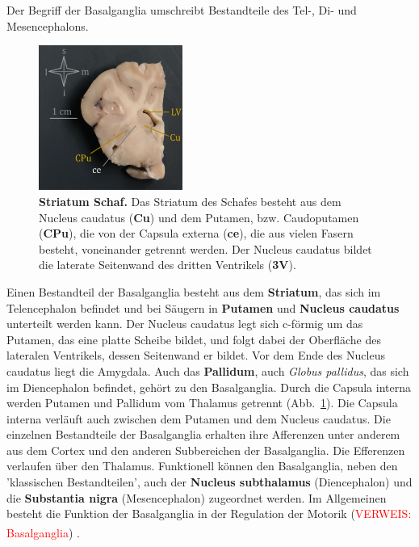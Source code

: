 \documentclass[12pt,a4paper,pdftex]{article}
\begin{document}
Der Begriff der Basalganglia umschreibt Bestandteile des Tel-, Di- und Mesencephalons.

\begin{figure}
    \centering
    \includegraphics[width=0.42\textwidth]{pictures/Bilder_Jule/Schaf/Ausschnitte/Striatum.png}
    \caption[Striatum Schaf.]{\textbf{Striatum Schaf.} Das Striatum des Schafes besteht aus dem Nucleus caudatus (\textbf{Cu}) und dem Putamen, bzw. Caudoputamen (\textbf{CPu}), die von der Capsula externa (\textbf{ce}), die aus vielen Fasern besteht, voneinander getrennt werden. Der Nucleus caudatus bildet die laterate Seitenwand des dritten Ventrikels (\textbf{3V}).}
    \label{fig:striatum}
\end{figure}

\noindent Einen Bestandteil der Basalganglia besteht aus dem \textbf{Striatum}, das sich im Telencephalon befindet und bei Säugern in \textbf{Putamen} und \textbf{Nucleus caudatus}  unterteilt werden kann. Der Nucleus caudatus legt sich c-förmig um das Putamen, das eine platte Scheibe bildet, und folgt dabei der Oberfläche des lateralen Ventrikels, dessen Seitenwand er bildet. Vor dem Ende des Nucleus caudatus liegt die Amygdala. Auch das \textbf{Pallidum}, auch \textit{Globus pallidus}, das sich im Diencephalon befindet, gehört zu den Basalganglia. Durch die Capsula interna werden Putamen und Pallidum vom Thalamus getrennt (Abb.~\ref{fig:striatum}). Die Capsula interna verläuft auch zwischen dem Putamen und dem Nucleus caudatus. Die einzelnen Bestandteile der Basalganglia erhalten ihre Afferenzen unter anderem aus dem Cortex und den anderen Subbereichen der Basalganglia. Die Efferenzen verlaufen über den Thalamus. Funktionell können den Basalganglia, neben den 'klassischen Bestandteilen', auch der \textbf{Nucleus subthalamus} (Diencephalon) und die \textbf{Substantia nigra} (Mesencephalon) zugeordnet werden.
Im Allgemeinen besteht die Funktion der Basalganglia in der Regulation der Motorik (\textcolor{red}{VERWEIS: Basalganglia}) \textsuperscript{\cite[9]{trepel2011neuroanatomie}}.
\end{document}
